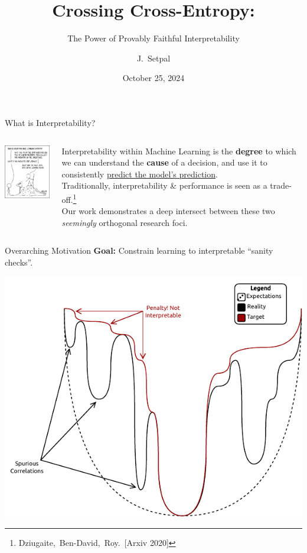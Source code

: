 \documentclass{beamer}
\title[Contrastive Optimization]{Crossing Cross-Entropy:}
\subtitle{The Power of Provably Faithful Interpretability}
\author[Mathematical Foundations of DL] %
{J.~Setpal}
\date{October 25, 2024}
\begin{document}
\frame{\titlepage}

\begin{frame}{What is Interpretability?}
		\begin{columns}
		\begin{column}{0.5\textwidth}
			\begin{center}
				\includegraphics[width=5cm]{img/1838} \pause
			\end{center}
		\end{column}
		\begin{column}{0.5\textwidth}
			Interpretability within Machine Learning is the \textbf{degree} to which we can understand the \textbf{cause} of a decision, and use it to consistently \underline{predict the model's prediction}. \pause \newline \\

			Traditionally, interpretability \& performance is seen as a trade-off.\footnote{Dziugaite,~Ben-David,~Roy.~[Arxiv 2020]} \pause \newline \\

			Our work demonstrates a deep intersect between these two \textit{seemingly} orthogonal research foci.
		\end{column}
	\end{columns}
\end{frame}

\begin{frame}{Overarching Motivation}
	\textbf{Goal:} Constrain learning to interpretable ``sanity checks''.
	\vspace{-1em}
	\begin{center}
		\includegraphics[width=.75\textwidth]{img/loss-landscape.pdf}
	\end{center}
\end{frame}
\end{document}
